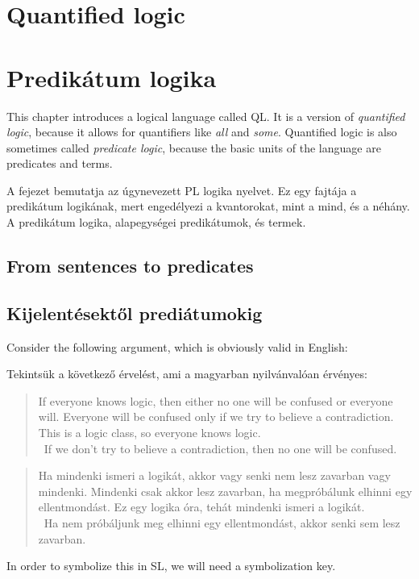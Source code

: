 
\chapter*{Quantified logic}
\chapter{Predikátum logika}
\label{ch.QL}

This chapter introduces a logical language called QL. It is a version of \emph{quantified logic}, because it allows for quantifiers like \emph{all} and \emph{some}. Quantified logic is also sometimes called \emph{predicate logic}, because the basic units of the language are predicates and terms.

A fejezet bemutatja az úgynevezett PL logika nyelvet. Ez egy fajtája a predikátum logikának, mert engedélyezi a kvantorokat, mint a mind, és a néhány. A predikátum logika, alapegységei predikátumok, és termek.

\section*{From sentences to predicates}
\section{Kijelentésektől prediátumokig}
Consider the following argument, which is obviously valid in English:

Tekintsük a következő érvelést, ami a magyarban nyilvánvalóan érvényes:
\begin{quote}
If everyone knows logic, then either no one will be confused or everyone will. Everyone will be confused only if we try to believe a contradiction. This is a logic class, so everyone knows logic.\\
\therefore\ If we don't try to believe a contradiction, then no one will be confused.
\end{quote}
\begin{quote}
Ha mindenki ismeri a logikát, akkor vagy senki nem lesz zavarban vagy mindenki. Mindenki csak akkor lesz zavarban, ha megpróbálunk elhinni egy ellentmondást. Ez egy logika óra, tehát mindenki ismeri a logikát.\\
\therefore\ Ha nem próbáljunk meg elhinni egy ellentmondást, akkor senki sem lesz zavarban.
\end{quote}
In order to symbolize this in SL, we will need a symbolization key.

